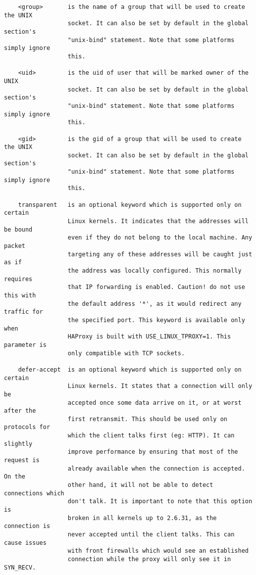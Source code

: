 \begin{verbatim}
    <group>       is the name of a group that will be used to create the UNIX
                  socket. It can also be set by default in the global section's
                  "unix-bind" statement. Note that some platforms simply ignore
                  this.

    <uid>         is the uid of user that will be marked owner of the UNIX
                  socket. It can also be set by default in the global section's
                  "unix-bind" statement. Note that some platforms simply ignore
                  this.

    <gid>         is the gid of a group that will be used to create the UNIX
                  socket. It can also be set by default in the global section's
                  "unix-bind" statement. Note that some platforms simply ignore
                  this.

    transparent   is an optional keyword which is supported only on certain
                  Linux kernels. It indicates that the addresses will be bound
                  even if they do not belong to the local machine. Any packet
                  targeting any of these addresses will be caught just as if
                  the address was locally configured. This normally requires
                  that IP forwarding is enabled. Caution! do not use this with
                  the default address '*', as it would redirect any traffic for
                  the specified port. This keyword is available only when
                  HAProxy is built with USE_LINUX_TPROXY=1. This parameter is
                  only compatible with TCP sockets.

    defer-accept  is an optional keyword which is supported only on certain
                  Linux kernels. It states that a connection will only be
                  accepted once some data arrive on it, or at worst after the
                  first retransmit. This should be used only on protocols for
                  which the client talks first (eg: HTTP). It can slightly
                  improve performance by ensuring that most of the request is
                  already available when the connection is accepted. On the
                  other hand, it will not be able to detect connections which
                  don't talk. It is important to note that this option is
                  broken in all kernels up to 2.6.31, as the connection is
                  never accepted until the client talks. This can cause issues
                  with front firewalls which would see an established
                  connection while the proxy will only see it in SYN_RECV.


\end{verbatim}
